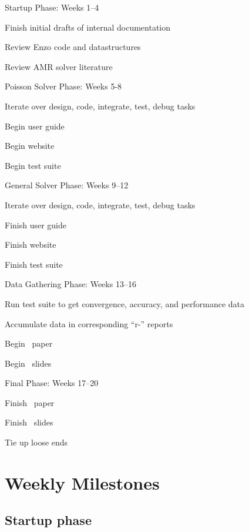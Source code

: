 \documentclass[11pt]{article}
\begin{document}
\BeginDESCRIPTION
  \item [Startup Phase: ] Weeks 1--4
    \BeginITEMIZE
      \item Finish initial drafts of internal documentation
      \item Review Enzo code and datastructures
      \item Review AMR solver literature
    \EndITEMIZE 
  \item [Poisson Solver Phase:] Weeks 5-8
    \BeginITEMIZE
      \item Iterate over design, code, integrate, test, debug tasks
      \item Begin user guide
      \item Begin website
      \item Begin test suite
    \EndITEMIZE
  \item [General Solver Phase:] Weeks 9--12
    \BeginITEMIZE
      \item Iterate over design, code, integrate, test, debug tasks
      \item Finish user guide
      \item Finish website
      \item Finish test suite
    \EndITEMIZE
  \item [Data Gathering Phase:] Weeks 13--16
    \BeginITEMIZE
      \item Run test suite to get convergence, accuracy, and performance data
      \item Accumulate data in corresponding ``r-'' reports
      \item Begin \amrSolve\ paper
      \item Begin \amrSolve\ slides
    \EndITEMIZE
  \item [Final Phase:] Weeks 17--20
    \BeginITEMIZE
      \item Finish \amrSolve\ paper
      \item Finish \amrSolve\ slides
      \item Tie up loose ends
    \EndITEMIZE
\EndDESCRIPTION



\section{Weekly Milestones}

\subsection{Startup phase}
\end{document}
